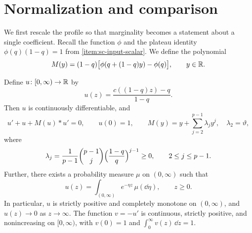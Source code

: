 \section{Normalization and comparison}
\label{subsec:sc-normalization}

We first rescale the profile so that marginality becomes a statement about a single coefficient. Recall the function $\phi$ and the plateau identity $\phi(q)(1-q)=1$ from \ref{item:sc-input-scalar}. We define the polynomial
\begin{equation}\label{eq:sc-memory-polynomial}
 M(y)=(1-q)\bigl[\phi(q+(1-q)y)-\phi(q)\bigr],\qquad y\in\mathbb R .
\end{equation}

\begin{lemma}\label{lem:sc-normalized-equation}
Define $u\colon[0,\infty)\to\mathbb R$ by
\[
 u(z)=\frac{c((1-q)z)-q}{1-q}.
\]
Then $u$ is continuously differentiable, and
\begin{equation}
 u'+u+M(u)*u'=0,\qquad u(0)=1,\qquad
 M(y)=y+\sum_{j=2}^{p-1}\lambda_jy^j,
 \quad\lambda_2=\vartheta,
 \label{eq:sc-normalized}
\end{equation}
where
\begin{equation}\label{eq:sc-memory-coefficients}
 \lambda_j=\frac1{p-1}\binom{p-1}{j}\Bigl(\frac{1-q}{q}\Bigr)^{j-1}\ge0,\qquad 2\le j\le p-1.
\end{equation}
Further, there exists a probability measure $\mu$ on $(0,\infty)$ such that
\begin{equation}\label{eq:sc-u-spectral}
 u(z)=\int_{(0,\infty)}e^{-\eta z}\,\mu(\dd\eta),\qquad z\ge0.
\end{equation}
In particular, $u$ is strictly positive and completely monotone on $(0,\infty)$, and $u(z)\to0$ as $z\to\infty$. The function $v=-u'$ is continuous, strictly positive, and nonincreasing on $[0,\infty)$, with $v(0)=1$ and $\int_0^\infty v(z)\,\dd z=1$.
\end{lemma}

